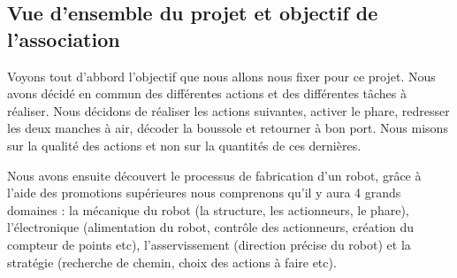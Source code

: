 \documentclass[a4paper,10pt]{article}
\begin{document}
\begin{spacing}{1.5}
\subsection{Vue d'ensemble du projet et objectif de l'association}
Voyons tout d'abbord l'objectif que nous allons nous fixer pour ce projet. Nous
avons décidé en commun des différentes actions et des différentes tâches à
réaliser. Nous décidons de réaliser les actions suivantes, activer le phare,
redresser les deux manches à air, décoder la boussole et retourner à bon port.
Nous misons sur la qualité des actions et non sur la quantités de ces
dernières.

Nous avons ensuite découvert le processus de fabrication d'un robot, grâce
à l'aide des promotions supérieures nous comprenons qu'il y aura 4 grands
domaines :  la mécanique du robot (la structure, les actionneurs, le phare),
l'électronique (alimentation du robot,
contrôle des actionneurs, création du compteur de points etc), l'asservissement (direction
précise du robot) et la stratégie (recherche de chemin, choix des actions à
faire etc).

\end{spacing}
\end{document}
